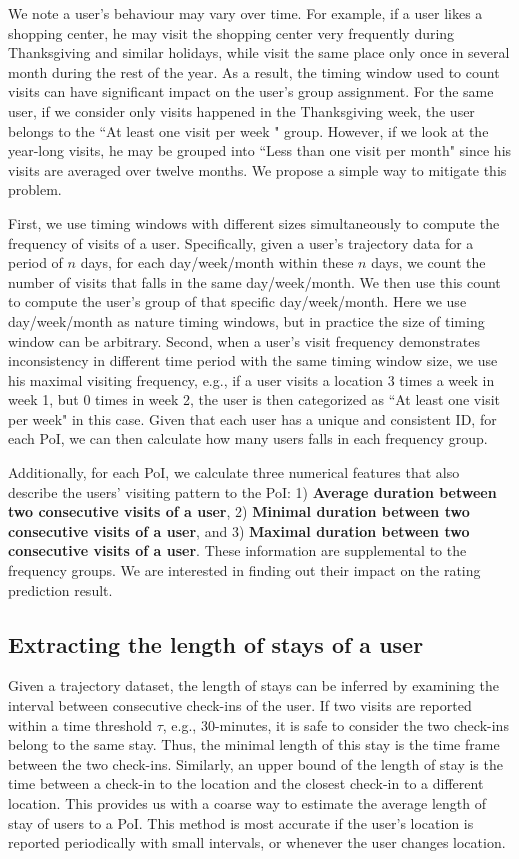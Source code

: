 We note a user's behaviour may vary over time. For example, if a user likes a shopping center, he may visit the shopping center very frequently during Thanksgiving and similar holidays, while visit the same place only once in several month during the rest of the year. As a result, the timing window used to count visits can have significant impact on the user's group assignment. For the same user, if we consider only visits happened in the Thanksgiving week, the user belongs to the ``At least one visit per week " group. However, if we look at the year-long visits, he may be grouped into ``Less than one visit per month" since his visits are averaged over twelve months. We propose a simple way to mitigate this problem.

First, we use timing windows with different sizes simultaneously to compute the frequency of visits of a user. Specifically, given a user's trajectory data for a period of $n$ days, for each day/week/month within these $n$ days, we count the number of visits that falls in the same day/week/month. We then use this count to compute the user's group of that specific day/week/month. Here we use day/week/month as nature timing windows, but in practice the size of timing window can be arbitrary. Second, when a user's visit frequency demonstrates inconsistency in different time period with the same timing window size, we use his maximal visiting frequency, e.g., if a user visits a location 3 times a week in week 1, but 0 times in week 2, the user is then categorized as ``At least one visit per week" in this case. Given that each user has a unique and consistent ID, for each PoI, we can then calculate how many users falls in each frequency group.

Additionally, for each PoI, we calculate three numerical features that also describe the users' visiting pattern to the PoI: 1) \textbf{Average duration between two consecutive visits of a user}, 2) \textbf{Minimal duration between two consecutive visits of a user}, and 3) \textbf{Maximal duration between two consecutive visits of a user}. These information are supplemental to the frequency groups. We are interested in finding out their impact on the rating prediction result.

\subsection{Extracting the length of stays of a user}

Given a trajectory dataset, the length of stays can be inferred by examining the interval between consecutive check-ins of the user. If two visits are reported within a time threshold $\tau$, e.g., 30-minutes, it is safe to consider the two check-ins belong to the same stay. Thus, the minimal length of this stay is the time frame between the two check-ins. Similarly, an upper bound of the length of stay is the time between a check-in to the location and the closest check-in to a different location. This provides us with a coarse way to estimate the average length of stay of users to a PoI. This method is most accurate if the user's location is reported periodically with small intervals, or whenever the user changes location.

